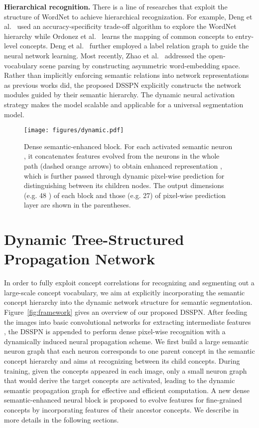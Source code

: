 \documentclass[10pt,twocolumn,letterpaper]{article}
\begin{document}
	
\textbf{Hierarchical recognition.} There is a line of researches that exploit the structure of WordNet to achieve hierarchical recognization. For example, Deng et al.~\cite{deng2012hedging} used an accuracy-specificity trade-off algorithm to explore the WordNet hierarchy while Ordonez et al.~\cite{ordonez2013large} learns the mapping of common concepts to entry-level concepts. Deng
et al.~\cite{deng2014large} further employed a label relation graph to guide the neural network learning. Most recently, Zhao et al.~\cite{zhao2017open} addressed the open-vocabulary scene parsing by constructing asymmetric word-embedding space. Rather than implicitly enforcing semantic relations into network representations as previous works did, the proposed DSSPN explicitly constructs the network modules guided by their semantic hierarchy. The dynamic neural activation strategy makes the model scalable and applicable for a universal segmentation model.

\begin{figure}[!tp]
		\begin{center}
			\texttt{[image: figures/dynamic.pdf]}
			\caption{Dense semantic-enhanced block. For each activated semantic neuron , it concatenates features evolved from the neurons in the whole path (dashed orange arrows) to obtain enhanced representation , which is further passed through dynamic pixel-wise prediction  for distinguishing between its children nodes. The output dimensions (e.g. 48 ) of each block and those (e.g. 27) of pixel-wise prediction layer are shown in the parentheses. }
			\label{fig:dynamic}
		\end{center}
		\vspace{-5mm}
	\end{figure}
	
\section{Dynamic Tree-Structured Propagation Network}
\label{sec:framework}
In order to fully exploit concept correlations for recognizing and segmenting out a large-scale concept vocabulary, we aim at explicitly incorporating the semantic concept hierarchy into the dynamic network structure for semantic segmentation. Figure~\ref{fig:framework} gives an overview of our proposed DSSPN. After feeding the images into basic convolutional networks for extracting intermediate features , the DSSPN is appended to perform dense pixel-wise recognition with a dynamically induced neural propagation scheme. We first build a large semantic neuron graph that each neuron corresponds to one parent concept in the semantic concept hierarchy and aims at recognizing between its child concepts. During training, given the concepts appeared in each image, only a small neuron graph that would derive the target concepts are activated, leading to the dynamic semantic propagation graph for effective and efficient computation. A new dense semantic-enhanced neural block is proposed to evolve features for fine-grained concepts by incorporating features of their ancestor concepts.  We describe in more details in the following sections.
\end{document}
